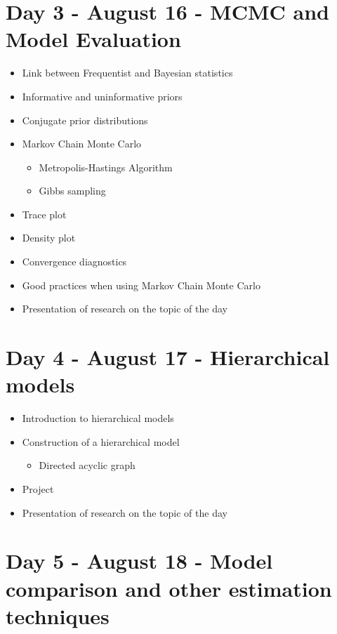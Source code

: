 \documentclass[12]{article}
\begin{document}
    \section*{Day 3 - August 16 - MCMC and Model Evaluation}

    \begin{itemize}[leftmargin=2.5cm]
      \item Link between Frequentist and Bayesian statistics
      \item Informative and uninformative priors
      \item Conjugate prior distributions
      \item Markov Chain Monte Carlo
      \begin{itemize}
        \item Metropolis-Hastings Algorithm
        \item Gibbs sampling
      \end{itemize}
      \item Trace plot
      \item Density plot
      \item Convergence diagnostics
      \item Good practices when using Markov Chain Monte Carlo
      \item Presentation of research on the topic of the day
    \end{itemize}

    \section*{Day 4 - August 17 - Hierarchical models}

    \begin{itemize}[leftmargin=2.5cm]
      \item Introduction to hierarchical models
      \item Construction of a hierarchical model
      \begin{itemize}
        \item Directed acyclic graph
      \end{itemize}
      \item Project
      \item Presentation of research on the topic of the day
    \end{itemize}

    \section*{Day 5 - August 18 - Model comparison and other estimation techniques}
\end{document}
